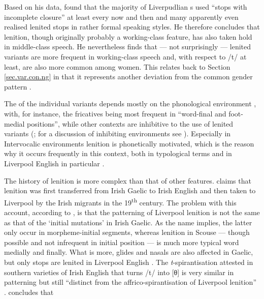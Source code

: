 Based on his \citeyear{knowles1973} data, \citeauthor{knowles1973} found that the majority of Liverpudlian s used ``stops with incomplete closure'' at least every now and then and many apparently even realised lenited stops in rather formal speaking styles.
He therefore concludes that lenition, though originally probably a working-class feature, has also taken hold in middle-class speech.
He nevertheless finds that --- not surprisingly --- lenited variants are more frequent in working-class speech and, with respect to /t/ at least, are also more common among women.
This relates back to Section \ref{sec.var.con.ng} in that it represents another deviation from the common gender pattern \citeyearpar[cf.][325--327]{knowles1973}.

The  of the individual variants depends mostly on the phonological environment , with, for instance, the fricatives being most frequent in ``word-final  and foot-medial positions'', while other contexts are inhibitive to the use of lenited variants (\citealp[cf.][130]{honeybone2007}; for a discussion of inhibiting environments see \citealt{honeybone2001}).
Especially in Intervocalic  environments lenition is phonetically motivated, which is the reason why it occurs frequently in this context, both in typological terms and in Liverpool English in particular \parencite[cf.][230 and 243]{honeybone2001}.

The history of lenition is more complex than that of other features.
\textcite{hickey1996} claims that lenition was first transferred from Irish Gaelic to Irish English and then taken to Liverpool by the Irish migrants in the 19\textsuperscript{th} century.
The problem with this account, according to \citet{honeybone2007}, is that the patterning of Liverpool lenition is not the same as that of the `initial mutations' in Irish Gaelic.
As the name implies, the latter only occur in morpheme-initial segments, whereas lenition in Scouse --- though possible and not infrequent in initial position --- is much more typical word medially and finally.
What is more, glides and nasals are also affected in Gaelic, but only stops are lenited in Liverpool English \citep[cf.][131]{honeybone2007}.
The \emph{t}-spirantisation attested in southern varieties of Irish English that turns /t/ into [θ] is very similar in patterning but still ``distinct  from the affrico-spirantisation of Liverpool lenition'' \citep[132]{honeybone2007}.
\citeauthor{honeybone2007} concludes that


